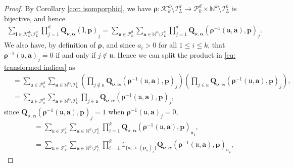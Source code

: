 \documentclass[pdflatex,sn-mathphys-num]{sn-jnl}%
\theoremstyle{thmstyleone}%
\theoremstyle{thmstyletwo}%
\theoremstyle{thmstylethree}%
\begin{document}
\begin{proof}
    By Corollary \ref{cor: isomporphic}, we have 
    \(\boldsymbol{\rho}:\mathcal{K}^d_k\setminus\mathcal{I}_L^d\rightarrow\mathcal{P}^d_k\times\mathbb{N}^k\setminus\mathcal{I}^k_L\) is bijective, and hence
    \begin{align}\label{eq: transformed indices}
        \sum_{\boldsymbol{l}\in\mathcal{K}^d_k\setminus \mathcal{I}^d_L}\prod_{j=1}^d{\mathbf{Q}_{\boldsymbol{\nu},\boldsymbol{\alpha}}(\boldsymbol{l},\mathbf{p})}_j=\sum_{\mathfrak{u}\in\mathcal{P}^d_k}\sum_{\mathbf{a}\in\mathbb{N}^k\setminus\mathcal{I}_L^k}\prod_{j=1}^d{\mathbf{Q}_{\boldsymbol{\nu},\boldsymbol{\alpha}}(\boldsymbol{\rho}^{-1}(\mathfrak{u},\mathbf{a}),\mathbf{p})}_j.
    \end{align}
    We also have, by definition of \(\boldsymbol{\rho}\), and since \(a_i>0\) for all \(1\leq i\leq k\), that \(\boldsymbol{\rho}^{-1}(\mathfrak{u},\mathbf{a})_j=0\) if and only if \(j\notin \mathfrak{u}\). Hence we can split the product in \eqref{eq: transformed indices} as
    \begin{align}
        &=\sum_{\mathfrak{u}\in\mathcal{P}^d_k}\sum_{\mathbf{a}\in\mathbb{N}^k\setminus\mathcal{I}_L^k}\left(\prod_{j\notin \mathfrak{u}}\mathbf{Q}_{\boldsymbol{\nu},\boldsymbol{\alpha}}(\boldsymbol{\rho}^{-1}(\mathfrak{u},\mathbf{a}),\mathbf{p})_j\right)\left(\prod_{j\in \mathfrak{u}}\mathbf{Q}_{\boldsymbol{\nu},\boldsymbol{\alpha}}(\boldsymbol{\rho}^{-1}(\mathfrak{u},\mathbf{a}),\mathbf{p})_j\right),\nonumber\\
        &=\sum_{\mathfrak{u}\in\mathcal{P}^d_k}\sum_{\mathbf{a}\in\mathbb{N}^k\setminus\mathcal{I}_L^k}\prod_{j\in \mathfrak{u}}\mathbf{Q}_{\boldsymbol{\nu},\boldsymbol{\alpha}}(\boldsymbol{\rho}^{-1}(\mathfrak{u},\mathbf{a}),\mathbf{p})_j,\nonumber
    \end{align}
    since \(\mathbf{Q}_{\boldsymbol{\nu},\boldsymbol{\alpha}}(\boldsymbol{\rho}^{-1}(\mathfrak{u},\mathbf{a}),\mathbf{p})_j=1\) when \(\boldsymbol{\rho}^{-1}(\mathfrak{u},\mathbf{a})_j=0\),
    \begin{align}
        &=\sum_{\mathfrak{u}\in\mathcal{P}^d_k}\sum_{\mathbf{a}\in\mathbb{N}^k\setminus\mathcal{I}_L^k}\prod_{i=1}^k{\mathbf{Q}_{\boldsymbol{\nu},\boldsymbol{\alpha}}(\boldsymbol{\rho}^{-1}(\mathfrak{u},\mathbf{a}),\mathbf{p})_{\mathfrak{u}}}_i,\nonumber\\
        &=\sum_{\mathfrak{u}\in\mathcal{P}^d_k}\sum_{\mathbf{a}\in\mathbb{N}^k\setminus\mathcal{I}_L^k}\prod_{i=1}^k{\mathds{1}_{\{a_i> (\mathbf{p}_{\mathfrak{u}})_i\}}{\mathbf{Q}_{\boldsymbol{\nu},\boldsymbol{\alpha}}(\boldsymbol{\rho}^{-1}(\mathfrak{u},\mathbf{a}),\mathbf{p})_{\mathfrak{u}}}_i},\nonumber

\end{align}
\end{proof}
\end{document}
